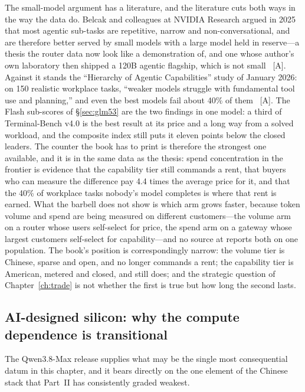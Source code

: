 The small-model argument has a literature, and the literature cuts both ways in the way the data do. Belcak and colleagues at NVIDIA Research argued in 2025 that most agentic sub-tasks are repetitive, narrow and non-conversational, and are therefore better served by small models with a large model held in reserve---a thesis the router data now look like a demonstration of, and one whose author's own laboratory then shipped a 120B agentic flagship, which is not small~\cite{slm-belcak} [A]. Against it stands the ``Hierarchy of Agentic Capabilities'' study of January 2026: on 150 realistic workplace tasks, ``weaker models struggle with fundamental tool use and planning,'' and even the best models fail about 40\% of them~\cite{slm-belcak} [A]. The Flash sub-scores of \S\ref{sec:glm53} are the two findings in one model: a third of Terminal-Bench v4.0 is the best result at its price and a long way from a solved workload, and the composite index still puts it eleven points below the closed leaders. The counter the book has to print is therefore the strongest one available, and it is in the same data as the thesis: spend concentration in the frontier is evidence that the capability tier still commands a rent, that buyers who can measure the difference pay 4.4 times the average price for it, and that the 40\% of workplace tasks nobody's model completes is where that rent is earned. What the barbell does not show is which arm grows faster, because token volume and spend are being measured on different customers---the volume arm on a router whose users self-select for price, the spend arm on a gateway whose largest customers self-select for capability---and no source at \datafreeze reports both on one population. The book's position is correspondingly narrow: the volume tier is Chinese, sparse and open, and no longer commands a rent; the capability tier is American, metered and closed, and still does; and the strategic question of Chapter~\ref{ch:trade} is not whether the first is true but how long the second lasts.

\subsection{AI-designed silicon: why the compute dependence is transitional}
\label{sec:offshore}

The Qwen3.8-Max release supplies what may be the single most consequential datum in this chapter, and it bears directly on the one element of the Chinese stack that Part~II has consistently graded weakest.

